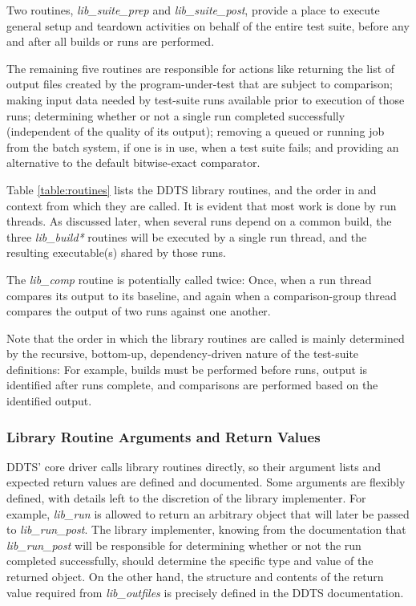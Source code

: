 \documentclass[conference]{IEEEtran}
\begin{document}
Two routines, \emph{lib\_suite\_prep} and \emph{lib\_suite\_post}, provide a place to execute general setup and teardown activities on behalf of the entire test suite, before any and after all builds or runs are performed.

The remaining five routines are responsible for actions like returning the list of output files created by the program-under-test that are subject to comparison; making input data needed by test-suite runs available prior to execution of those runs; determining whether or not a single run completed successfully (independent of the quality of its output); removing a queued or running job from the batch system, if one is in use, when a test suite fails; and providing an alternative to the default bitwise-exact comparator.

Table \ref{table:routines} lists the DDTS library routines, and the order in and context from which they are called. It is evident that most work is done by run threads. As discussed later, when several runs depend on a common build, the three \emph{lib\_build*} routines will be executed by a single run thread, and the resulting executable(s) shared by those runs.

The \emph{lib\_comp} routine is potentially called twice: Once, when a run thread compares its output to its baseline, and again when a comparison-group thread compares the output of two runs against one another.

Note that the order in which the library routines are called is mainly determined by the recursive, bottom-up, dependency-driven nature of the test-suite definitions: For example, builds must be performed before runs, output is identified after runs complete, and comparisons are performed based on the identified output.

\subsubsection{Library Routine Arguments and Return Values}

DDTS' core driver calls library routines directly, so their argument lists and expected return values are defined and documented. Some arguments are flexibly defined, with details left to the discretion of the library implementer. For example, \emph{lib\_run} is allowed to return an arbitrary object that will later be passed to \emph{lib\_run\_post}. The library implementer, knowing from the documentation that \emph{lib\_run\_post} will be responsible for determining whether or not the run completed successfully, should determine the specific type and value of the returned object. On the other hand, the structure and contents of the return value required from \emph{lib\_outfiles} is precisely defined in the DDTS documentation.
\end{document}
